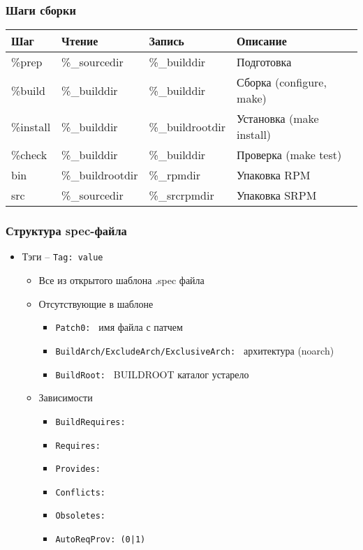 \begin{frame}
	\frametitle{Шаги сборки}
	
			\begin{table}
				\begin{tabular}{l | l | l | l }
				Шаг & Чтение & Запись & Описание \\
				\hline 
				\%prep & \%\_sourcedir & \%\_builddir & Подготовка\\
				\%build & \%\_builddir & \%\_builddir & Сборка (configure, make)\\
				\%install & \%\_builddir & \%\_buildrootdir & Установка (make install)\\
				\%check &	\%\_builddir & \%\_builddir & Проверка (make test)\\
				\hline 
				bin & \%\_buildrootdir	&\%\_rpmdir & Упаковка RPM\\
				src & \%\_sourcedir & \%\_srcrpmdir & Упаковка SRPM\\
				\end{tabular}
			\end{table}
\end{frame}

\begin{frame}
	\frametitle{Структура spec-файла}
	\begin{itemize}
		\item Тэги -- {\tt Tag: value}
		\begin{itemize}
		\item Все из открытого шаблона .spec файла
		\item Отсутствующие в шаблоне
			\begin{itemize}
			\item {\tt Patch0: } имя файла с патчем
			\item {\tt BuildArch/ExcludeArch/ExclusiveArch: } архитектура (noarch)
			\item {\tt BuildRoot: } BUILDROOT каталог устарело
			\end{itemize}
		\item Зависимости
			\begin{itemize}
			\item {\tt BuildRequires:}
			\item {\tt Requires:}
			\item {\tt Provides:}
			\item {\tt Conflicts:}
			\item {\tt Obsoletes:}
			\item {\tt AutoReqProv: (0|1)}
			\end{itemize}
		\end{itemize}
	\end{itemize}
\end{frame}

